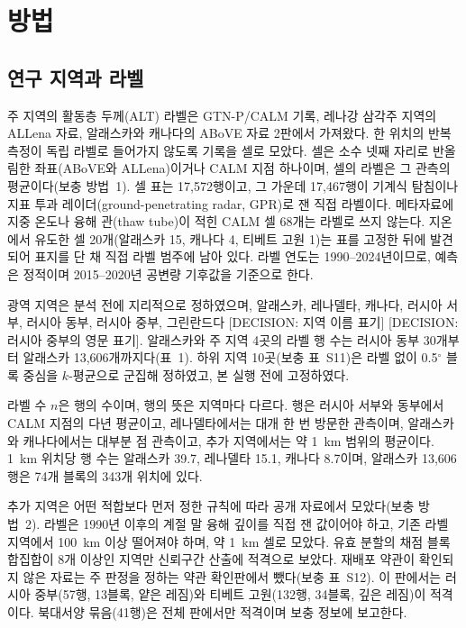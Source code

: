 
\section{방법}\label{sec:methods}

\subsection{연구 지역과 라벨}\label{sec:m-labels}

주 지역의 활동층 두께(ALT) 라벨은 GTN-P/CALM 기록\cite{Streletskiy2025}, 레나강 삼각주 지역의 ALLena 자료\cite{Veremeeva2025}, 알래스카와 캐나다의 ABoVE 자료 2판\cite{Moore2025}에서 가져왔다. 한 위치의 반복 측정이 독립 라벨로 들어가지 않도록 기록을 셀로 모았다. 셀은 소수 넷째 자리로 반올림한 좌표(ABoVE와 ALLena)이거나 CALM 지점 하나이며, 셀의 라벨은 그 관측의 평균이다(보충 방법~1). 셀 표는 17,572행이고, 그 가운데 17,467행이 기계식 탐침이나 지표 투과 레이더(ground-penetrating radar, GPR)로 잰 직접 라벨이다. 메타자료에 지중 온도나 융해 관(thaw tube)이 적힌 CALM 셀 68개는 라벨로 쓰지 않는다. 지온에서 유도한 셀 20개(알래스카 15, 캐나다 4, 티베트 고원 1)는 표를 고정한 뒤에 발견되어 표지를 단 채 직접 라벨 범주에 남아 있다. 라벨 연도는 1990--2024년이므로, 예측은 정적이며 2015--2020년 공변량 기후값을 기준으로 한다.

광역 지역은 분석 전에 지리적으로 정하였으며, 알래스카, 레나델타, 캐나다, 러시아 서부, 러시아 동부, 러시아 중부, 그린란드다 [DECISION: 지역 이름 표기] [DECISION: 러시아 중부의 영문 표기]. 알래스카와 주 지역 4곳의 라벨 행 수는 러시아 동부 30개부터 알래스카 13,606개까지다(표~1). 하위 지역 10곳(보충 표~S11)은 라벨 없이 0.5$^{\circ}$ 블록 중심을 $k$-평균으로 군집해 정하였고, 본 실행 전에 고정하였다.

라벨 수 $n$은 행의 수이며, 행의 뜻은 지역마다 다르다. 행은 러시아 서부와 동부에서 CALM 지점의 다년 평균이고, 레나델타에서는 대개 한 번 방문한 관측이며, 알래스카와 캐나다에서는 대부분 점 관측이고, 추가 지역에서는 약 1~km 범위의 평균이다. 1~km 위치당 행 수는 알래스카 39.7, 레나델타 15.1, 캐나다 8.7이며, 알래스카 13,606행은 74개 블록의 343개 위치에 있다.

추가 지역은 어떤 적합보다 먼저 정한 규칙에 따라 공개 자료에서 모았다(보충 방법~2). 라벨은 1990년 이후의 계절 말 융해 깊이를 직접 잰 값이어야 하고, 기존 라벨 지역에서 100~km 이상 떨어져야 하며, 약 1~km 셀로 모았다. 유효 분할의 채점 블록 합집합이 8개 이상인 지역만 신뢰구간 산출에 적격으로 보았다. 재배포 약관이 확인되지 않은 자료는 주 판정을 정하는 약관 확인판에서 뺐다(보충 표~S12). 이 판에서는 러시아 중부(57행, 13블록, 얕은 레짐)와 티베트 고원(132행, 34블록, 깊은 레짐)이 적격이다. 북대서양 묶음(41행)은 전체 판에서만 적격이며 보충 정보에 보고한다.

